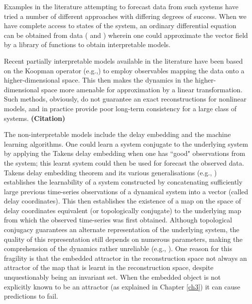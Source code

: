 \documentclass[a4paper,12pt,twoside]{report}
\begin{document}
Examples in the literature attempting to forecast data from such systems have tried a number of different approaches with differing degrees of success. 
When we have complete access to states of the system, an ordinary differential equation can be obtained from data (\cite{brunton2016discovering, champion2019data} and \cite{small2002modeling,xu2006modeling}) wherein one could approximate the vector field by a library of functions to obtain interpretable models. 


Recent partially interpretable models available in the literature have been based on the Koopman operator (e.g.,\cite{koopman1932dynamical,budivsic2012applied}) to  employ observables mapping the data onto a higher-dimensional space. This then makes the dynamics in the higher-dimensional space more amenable for approximation by a linear transformation. Such methods, obviously, do not guarantee an exact reconstructions for nonlinear models, and in practice provide poor long-term consistency for a large class of systems. \textbf{(Citation)}

The non-interpretable models include the delay embedding and the machine learning algorithms. One could learn a system conjugate to the underlying system by applying the Takens delay embedding \cite{takens1981detecting} when one has ``good" observations from the system; this learnt system could then be used for forecast the observed data.  Takens delay embedding theorem \cite{takens1981detecting} and its various generalisations (e.g., \cite{sauer1991embedology, stark1999delay, gutman2018embedding}) establishes the learnability of a system constructed by concatenating sufficiently large previous time-series observations of a dynamical system into a vector (called delay coordinates). This then establishes the existence of a map on the space of delay coordinates equivalent (or topologically conjugate) to the underlying map from which the observed time-series was first obtained. Although topological conjugacy guarantees an alternate representation of the underlying system, the quality of this representation still depends on numerous parameters, making the comprehension of the dynamics rather unreliable (e.g., \cite{principe1992prediction}). One reason for this fragility is that the embedded attractor in the reconstruction space not always an attractor of the map that is learnt in the reconstruction space, despite  unquestionably being an invariant set. When the embedded object is not explicitly known to be an attractor (as explained in Chapter \ref{ch3}) it can cause predictions to fail.
\end{document}
